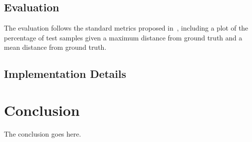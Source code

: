 \documentclass[journal,comsoc]{IEEEtran}
\let\MYoriglatexcaption\caption
\renewcommand{\caption}[2][\relax]{\MYoriglatexcaption[#2]{#2}}
\begin{document}
\subsection{Evaluation}\label{sec:evaluation}
The evaluation follows the standard metrics proposed in~\cite{tompson2014real}, including a plot of the percentage of test samples given a maximum distance from 
ground truth and a mean distance from ground truth. 
\subsection{Implementation Details}\label{sec:implementation}


\section{Conclusion}\label{sec:conclusion}
The conclusion goes here.

%
%

\end{document}

